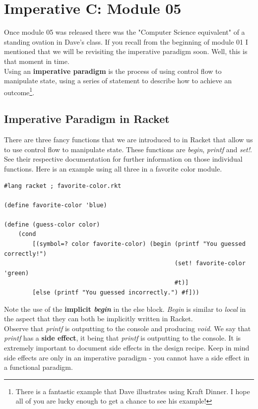 \documentclass[12pt,extarticle]{article}
\begin{document}
\newpage
\section{Imperative C: Module 05}

Once module 05 was released there was the "Computer Science equivalent" of a standing ovation in Dave's class. If you recall from the beginning of module 01 I mentioned that we will be revisiting the imperative paradigm soon. Well, this is that moment in time.\\

Using an \textbf{imperative paradigm} is the process of using control flow to manipulate state, using a series of statement to describe how to achieve an outcome\footnote{There is a fantastic example that Dave illustrates using Kraft Dinner. I hope all of you are lucky enough to get a chance to see his example!}.

\subsection{Imperative Paradigm in Racket}

There are three fancy functions that we are introduced to in Racket that allow us to use control flow to manipulate state. These functions are \emph{begin}, \emph{printf} and \emph{set!}. See their respective documentation for further information on those individual functions. Here is an example using all three in a favorite color module.\\

\lstset {
	language=Lisp
}
\begin{lstlisting}
#lang racket ; favorite-color.rkt

(define favorite-color 'blue)

(define (guess-color color)
	(cond
		[(symbol=? color favorite-color) (begin (printf "You guessed correctly!")
		                                        (set! favorite-color 'green)
		                                        #t)]
		[else (printf "You guessed incorrectly.") #f]))
\end{lstlisting}

Note the use of the \textbf{implicit \emph{begin}} in the else block. \emph{Begin} is similar to \emph{local} in the aspect that they can both be implicitly written in Racket.\\

Observe that \emph{printf} is outputting to the console and producing \emph{void}. We say that \emph{printf} has a \textbf{side effect}, it being that \emph{printf} is outputting to the console. It is extremely important to document side effects in the design recipe. Keep in mind side effects are only in an imperative paradigm - you cannot have a side effect in a functional paradigm.\\
\end{document}
